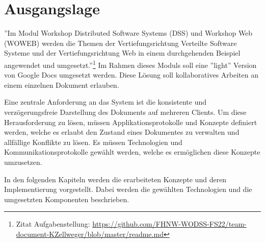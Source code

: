 \section{Ausgangslage}

''Im Modul Workshop Distributed Software Systems (DSS) und Workshop Web (WOWEB) werden die Themen der Vertiefungsrichtung Verteilte Software Systeme und der Vertiefungsrichtung Web in einem durchgehenden Beispiel angewendet und umgesetzt.''\footnote{Zitat Aufgabenstellung: \href{https://github.com/FHNW-WODSS-FS22/team-document-KZellweger/blob/master/readme.md}{https://github.com/FHNW-WODSS-FS22/team-document-KZellweger/blob/master/readme.md}}
Im Rahmen dieses Moduls soll eine ''light'' Version von Google Docs umgesetzt werden.
Diese Lösung soll kollaboratives Arbeiten an einem einzelnen Dokument erlauben.

Eine zentrale Anforderung an das System ist die konsistente und verzögerungsfreie Darstellung des Dokuments auf mehreren Clients.
Um diese Herausforderung zu lösen, müssen Applikationsprotokolle und Konzepte definiert werden, welche es erlaubt den Zustand eines Dokumentes zu verwalten und allfällige Konflikte zu lösen.
Es müssen Technologien und Kommunikationsprotokolle gewählt werden, welche es ermöglichen diese Konzepte umzusetzen.

In den folgenden Kapiteln werden die erarbeiteten Konzepte und deren Implementierung vorgestellt.
Dabei werden die gewählten Technologien und die umgesetzten Komponenten beschrieben.
